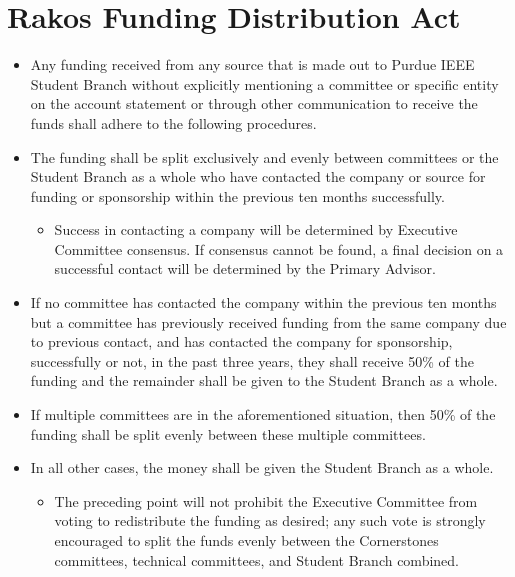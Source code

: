 \documentclass[12pt]{constitution}
\begin{document}
\section{Rakos Funding Distribution Act}
\label{sec:rakos_funding_distribution_act}
\begin{itemize}
    \item Any funding received from any source that is made out to Purdue IEEE Student Branch without explicitly mentioning a committee or specific entity on the account statement or through other communication to receive the funds shall adhere to the following procedures.
    \item The funding shall be split exclusively and evenly between committees or the Student Branch as a whole who have contacted the company or source for funding or sponsorship within the previous ten months successfully.
    \begin{itemize}
        \item Success in contacting a company will be determined by Executive Committee consensus. If consensus cannot be found, a final decision on a successful contact will be determined by the Primary Advisor.
    \end{itemize}
    \item If no committee has contacted the company within the previous ten months but a committee has previously received funding from the same company due to previous contact, and has contacted the company for sponsorship, successfully or not, in the past three years, they shall receive 50\% of the funding and the remainder shall be given to the Student Branch as a whole.
    \item If multiple committees are in the aforementioned situation, then 50\% of the funding shall be split evenly between these multiple committees.
    \item In all other cases, the money shall be given the Student Branch as a whole.
    \begin{itemize}
        \item The preceding point will not prohibit the Executive Committee from voting to redistribute the funding as desired; any such vote is strongly encouraged to split the funds evenly between the Cornerstones committees, technical committees, and Student Branch combined.
    \end{itemize}
\end{itemize}
\end{document}
